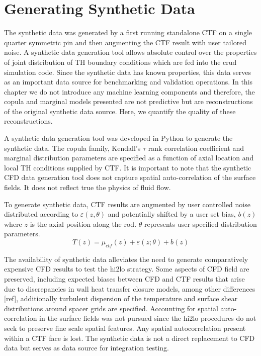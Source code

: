

\section{Generating Synthetic Data}

The synthetic data was generated by a first running standalone CTF on a single quarter symmetric pin and then augmenting the CTF result with user tailored noise.  A synthetic data generation tool allows absolute control over the properties of joint distribution of TH boundary conditions which are fed into the crud simulation code.  Since the synthetic data has known properties, this data serves as an important data source for benchmarking and validation operations.  In this chapter we do not introduce any machine learning components and therefore, the copula and marginal models presented are not predictive but are reconstructions of the original synthetic data source.  Here, we quantify the quality of these reconstructions.

A synthetic data generation tool was developed in Python to generate the synthetic data.  The copula family, Kendall's $\tau$ rank correlation coefficient and marginal distribution parameters are specified as a function of axial location and local TH conditions supplied by CTF.  It is important to note that the synthetic CFD data generation tool does not capture spatial auto-correlation of the surface fields.  It does not reflect true the physics of fluid flow.

To generate synthetic data, CTF results are augmented by user controlled noise distributed according to
$ \varepsilon(z, \theta)$
and potentially shifted by a user set bias,
$ b(z)$ where $z$ is the axial position along the rod.
$\theta$ represents user specified distribution parameters.
\begin{equation}
T(z) = \mu_{ctf}(z) + \varepsilon (z; \theta) +  b(z)
\end{equation}


The availability of synthetic data alleviates the need to generate comparatively expensive CFD results to test the hi2lo strategy.  Some aspects of CFD field are preserved, including expected biases between CFD and CTF results that arise due to discrepancies in wall heat transfer closure models, among other differences [ref], additionally turbulent dispersion of the temperature and surface shear distributions around spacer grids are specified.  Accounting for spatial auto-correlation in the surface fields was not pursued since the hi2lo procedures do not seek to preserve fine scale spatial features.  Any spatial autocorrelation present within a CTF face is lost.  The synthetic data is not a direct replacement to CFD data but serves as data source for integration testing.

